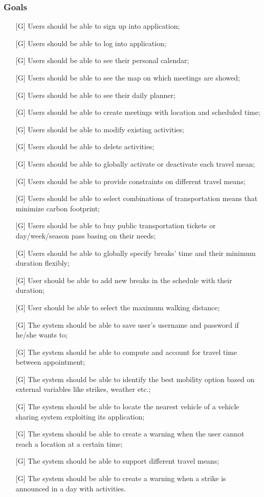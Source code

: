 \documentclass[12pt,titlepage]{article}
\begin{document}
\subsubsection{Goals}\label{RASD}
\begin{itemize}

\item [{[G\ped{1}]}]	Users should be able to sign up into application;
\item [{[G\ped{2}]}]		Users should be able to log into application;
\item [{[G\ped{3}]}]		Users should be able to see their personal calendar;
\item [{[G\ped{4}]}]		Users should be able to see the map on which meetings are showed;
\item [{[G\ped{5}]}]		Users should be able to see their daily planner;
\item [{[G\ped{6}]}]		Users should be able to create meetings with location and scheduled time;
\item [{[G\ped{7}]}]		Users should be able to modify existing activities;
\item [{[G\ped{8}]}]		Users should be able to delete activities;
\item [{[G\ped{9}]}]		Users should be able to globally activate or deactivate each travel mean;
\item [{[G\ped{10}]}]		Users should be able to provide constraints on different travel means;
\item [{[G\ped{11}]}]		Users should be able to select combinations of transportation means that minimize carbon footprint;
\item [{[G\ped{12}]}]		Users should be able to buy public transportation tickets or day/week/season pass basing on their needs;
\item [{[G\ped{13}]}]		Users should be able to globally specify breaks' time and their minimum duration flexibly;
\item [{[G\ped{14}]}]		User should be able to add new breaks in the schedule with their duration;
\item [{[G\ped{15}]}]		User should be able to select the maximum walking distance;
\item [{[G\ped{16}]}]	The system should be able to save user's username and password if he/she wants to;
\item [{[G\ped{17}]}]		The system should be able to compute and account for travel time between appointment;
\item [{[G\ped{18}]}]		The system should be able to identify the best mobility option based on external variables like strikes, weather etc.;
\item [{[G\ped{19}]}]		The system should be able to locate the nearest vehicle of a vehicle sharing system exploiting its application;
\item [{[G\ped{20}]}]		The system should be able to create a warning when the user cannot reach a location at a certain time;
\item [{[G\ped{21}]}]		The system should be able to support different travel means;
\item [{[G\ped{22}]}]		The system should be able to create a warning when a strike is announced in a day with activities.


\end{itemize}
\end{document}
